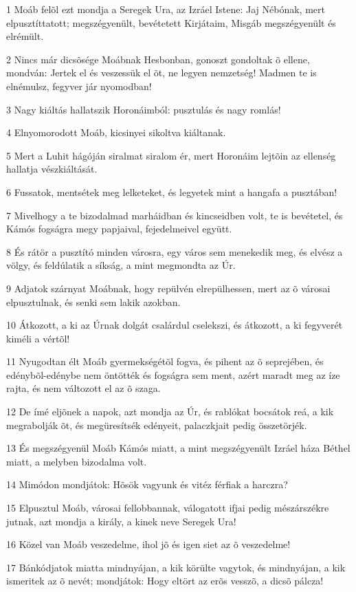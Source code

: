 \par 1 Moáb felõl ezt mondja a Seregek Ura, az Izráel Istene: Jaj Nébónak, mert elpusztíttatott; megszégyenült, bevétetett Kirjátaim, Misgáb megszégyenült és elrémült.
\par 2 Nincs már dicsõsége Moábnak Hesbonban, gonoszt gondoltak õ ellene, mondván: Jertek el és veszessük el õt, ne legyen nemzetség! Madmen te is elnémulsz, fegyver jár nyomodban!
\par 3 Nagy kiáltás hallatszik Horonáimból: pusztulás és nagy romlás!
\par 4 Elnyomorodott Moáb, kicsinyei sikoltva kiáltanak.
\par 5 Mert a Luhit hágóján siralmat siralom ér, mert Horonáim lejtõin az ellenség hallatja vészkiáltását.
\par 6 Fussatok, mentsétek meg lelketeket, és legyetek mint a hangafa a pusztában!
\par 7 Mivelhogy a te bizodalmad marháidban és kincseidben volt, te is bevétetel, és Kámós fogságra megy papjaival, fejedelmeivel együtt.
\par 8 És rátör a pusztító minden városra, egy város sem menekedik meg, és elvész a völgy, és feldúlatik a síkság, a mint megmondta az Úr.
\par 9 Adjatok szárnyat Moábnak, hogy repülvén elrepülhessen, mert az õ városai elpusztulnak, és senki sem lakik azokban.
\par 10 Átkozott, a ki az Úrnak dolgát csalárdul cselekszi, és átkozott, a ki fegyverét kiméli a vértõl!
\par 11 Nyugodtan élt Moáb gyermekségétõl fogva, és pihent az õ seprejében, és edénybõl-edénybe nem öntötték és fogságra sem ment, azért maradt meg az íze rajta, és nem változott el az õ szaga.
\par 12 De ímé eljõnek a napok, azt mondja az Úr, és rablókat bocsátok reá, a kik megrabolják õt, és megüresítsék edényeit, palaczkjait pedig összetörjék.
\par 13 És megszégyenül Moáb Kámós miatt, a mint megszégyenült Izráel háza Béthel  miatt, a melyben bizodalma volt.
\par 14 Mimódon mondjátok: Hõsök vagyunk és vitéz férfiak a harczra?
\par 15 Elpusztul Moáb, városai fellobbannak, válogatott ifjai pedig mészárszékre jutnak, azt mondja a király, a kinek neve Seregek Ura!
\par 16 Közel van Moáb veszedelme, ihol jõ és igen siet az õ veszedelme!
\par 17 Bánkódjatok miatta mindnyájan, a kik körülte vagytok, és mindnyájan, a kik ismeritek az õ nevét; mondjátok: Hogy eltört az erõs vesszõ, a dicsõ pálcza!

